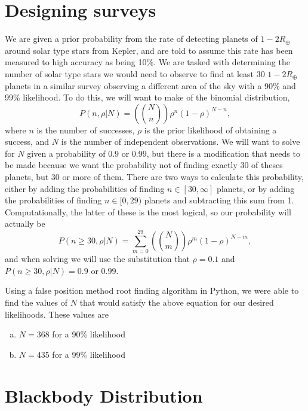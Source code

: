 \documentclass[12pt,a4paper]{article}
\begin{document}
\section{Designing surveys}
We are given a prior probability from the rate of detecting planets of $1-2 R_{\oplus}$ around solar type stars from Kepler, and are told to assume this rate has been measured to high accuracy as being 10\%. We are tasked with determining the number of solar type stars we would need to observe to find at least 30 $1-2 R_{\oplus}$ planets in a similar survey observing a different area of the sky with a 90\% and 99\% likelihood. To do this, we will want to make of the binomial distribution,
\begin{equation*}
  P(n, \rho | N) = \left(N \choose n\right) \rho^n \left(1 - \rho\right)^{N - n},
\end{equation*}
where $n$ is the number of successes, $\rho$ is the prior likelihood of obtaining a success, and $N$ is the number of independent observations. We will want to solve for $N$ given a probability of 0.9 or 0.99, but there is a modification that needs to be made because we want the probability not of finding exactly 30 of theses planets, but 30 or more of them. There are two ways to calculate this probability, either by adding the probabilities of finding $n \in {[30, \infty]}$ planets, or by adding the probabilities of finding $n \in {[0, 29)}$ planets and subtracting this sum from 1. Computationally, the latter of these is the most logical, so our probability will actually be
  \begin{equation*}
    P(n \ge 30, \rho | N) = \sum_{m = 0}^{29} \left(N \choose m\right) \rho^m \left(1 - \rho\right)^{N - m},
  \end{equation*}
  and when solving we will use the substitution that $\rho = 0.1$ and $P(n \ge 30, \rho | N) = 0.9$ or $0.99$.

  Using a false position method root finding algorithm in Python, we were able to find the values of $N$ that would satisfy the above equation for our desired likelihoods. These values are
  \begin{enumerate}[a)]
  \item $N = 368$ for a 90\% likelihood
  \item $N = 435$ for a 99\% likelihood
  \end{enumerate}

\section{Blackbody Distribution}
\end{document}
